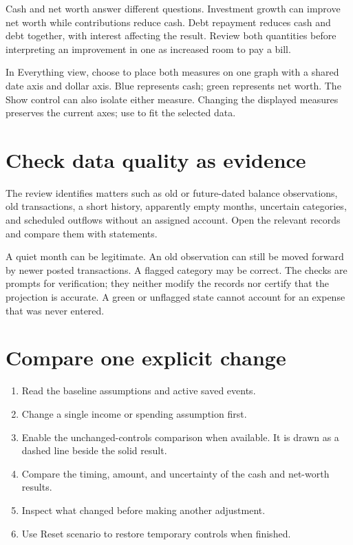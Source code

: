 Cash and net worth answer different questions. Investment growth can improve net worth while contributions reduce cash. Debt repayment reduces cash and debt together, with interest affecting the result. Review both quantities before interpreting an improvement in one as increased room to pay a bill.

In Everything view, choose  to place both measures on one graph with a shared date axis and dollar axis. Blue represents cash; green represents net worth. The Show control can also isolate either measure. Changing the displayed measures preserves the current axes; use  to fit the selected data.

\section{Check data quality as evidence}
The review identifies matters such as old or future-dated balance observations, old transactions, a short history, apparently empty months, uncertain categories, and scheduled outflows without an assigned account. Open the relevant records and compare them with statements.

A quiet month can be legitimate. An old observation can still be moved forward by newer posted transactions. A flagged category may be correct. The checks are prompts for verification; they neither modify the records nor certify that the projection is accurate. A green or unflagged state cannot account for an expense that was never entered.

\section{Compare one explicit change}
\begin{enumerate}
\item Read the baseline assumptions and active saved events.
\item Change a single income or spending assumption first.
\item Enable the unchanged-controls comparison when available. It is drawn as a dashed line beside the solid result.
\item Compare the timing, amount, and uncertainty of the cash and net-worth results.
\item Inspect what changed before making another adjustment.
\item Use Reset scenario to restore temporary controls when finished.
\end{enumerate}

